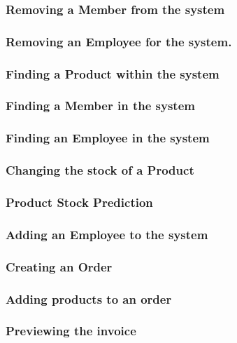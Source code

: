 \subsubsection{Removing a Member from the system}

\subsubsection{Removing an Employee for the system.}

\subsubsection{Finding a Product within the system}

\subsubsection{Finding a Member in the system}

\subsubsection{Finding an Employee in the system}

\subsubsection{Changing the stock of a Product}

\subsubsection{Product Stock Prediction}

\subsubsection{Adding an Employee to the system}

\subsubsection{Creating an Order}

\subsubsection{Adding products to an order}

\subsubsection{Previewing the invoice}


